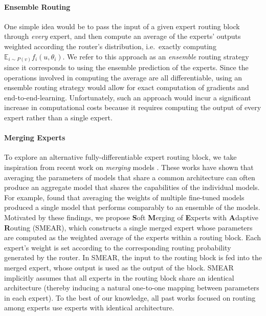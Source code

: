 \documentclass{article}
\theoremstyle{plain}
\theoremstyle{definition}
\theoremstyle{remark}
\begin{document}
\paragraph{Ensemble Routing}

One simple idea would be to pass the input of a given expert routing block through \textit{every} expert, and then compute an average of the experts' outputs weighted according the router's distribution, i.e.\ exactly computing $\mathbb{E}_{i \sim P(v)} f_i(u, \theta_i)$.
We refer to this approach as an \textit{ensemble} routing strategy since it corresponds to using the ensemble prediction of the experts.
Since the operations involved in computing the average are all differentiable, using an ensemble routing strategy would allow for exact computation of gradients and end-to-end-learning.
Unfortunately, such an approach would incur a significant increase in computational costs because it requires computing the output of every expert rather than a single expert.

\paragraph{Merging Experts}
To explore an alternative fully-differentiable expert routing block, we take inspiration from recent work on \textit{merging} models \citep{matena2021merging,wortsman2022model,wortsman2022robust,choshen2022fusing,don2022cold}.
These works have shown that averaging the parameters of models that share a common architecture can often produce an aggregate model that shares the capabilities of the individual models.
For example, \citet{wortsman2022model} found that averaging the weights of multiple fine-tuned models produced a single model that performs comparably to an ensemble of the models.
Motivated by these findings, we propose \textbf{S}oft \textbf{M}erging of \textbf{E}xperts with \textbf{A}daptive \textbf{R}outing (SMEAR), which constructs a single merged expert whose parameters are computed as the weighted average of the experts within a routing block.
Each expert's weight is set according to the corresponding routing probability generated by the router.
In SMEAR, the input to the routing block is fed into the merged expert, whose output is used as the output of the block.
SMEAR implicitly assumes that all experts in the routing block share an identical architecture (thereby inducing a natural one-to-one mapping between parameters in each expert).
To the best of our knowledge, all past works focused on routing among experts use experts with identical architecture.
\end{document}
